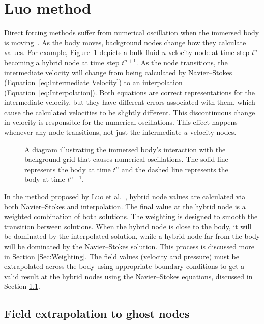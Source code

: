 \section{Luo method}

Direct forcing methods suffer from numerical oscillation when the immersed body is moving~\cite{Sotiropoulos:2014gv, Mittal:2005ii, liao2010simulating}. 
As the body moves, background nodes change how they calculate values. 
For example, Figure~\ref{fig:Temporal Discontinuity} depicts a bulk-fluid $u$ velocity node at time step $t^n$ becoming a hybrid node at time step $t^{n+1}$. 
As the node transitions, the intermediate velocity will change from being calculated by Navier--Stokes (Equation~\eqref{eq:Intermediate Velocity}) to an interpolation (Equation~\eqref{eq:Interpolation}). 
Both equations are correct representations for the intermediate velocity, but they have different errors associated with them, which cause the calculated velocities to be slightly different. 
This discontinuous change in velocity is responsible for the numerical oscillations. 
This effect happens whenever any node transitions, not just the intermediate $u$ velocity nodes.

\begin{figure}[!htb]
    \centering
    
    \caption{A diagram illustrating the immersed body's interaction with the background grid that causes numerical oscillations. The solid line represents the body at time $t^n$ and the dashed line represents the body at time $t^{n+1}$.}
    \label{fig:Temporal Discontinuity}
\end{figure}

In the method proposed by Luo et al.~\cite{Luo:2012gx}, hybrid node values are calculated via both Navier--Stokes and interpolation.
The final value at the hybrid node is a weighted combination of both solutions. 
The weighting is designed to smooth the transition between solutions. 
When the hybrid node is close to the body, it will be dominated by the interpolated solution, while a hybrid node far from the body will be dominated by the Navier--Stokes solution. 
This process is discussed more in Section \ref{Sec:Weighting}. 
The field values (velocity and pressure) must be extrapolated across the body using appropriate boundary conditions to get a valid result at the hybrid nodes using the Navier--Stokes equations, discussed in Section \ref{Sec:Field Extrapolation}. 

\subsection{Field extrapolation to ghost nodes}
\label{Sec:Field Extrapolation}

